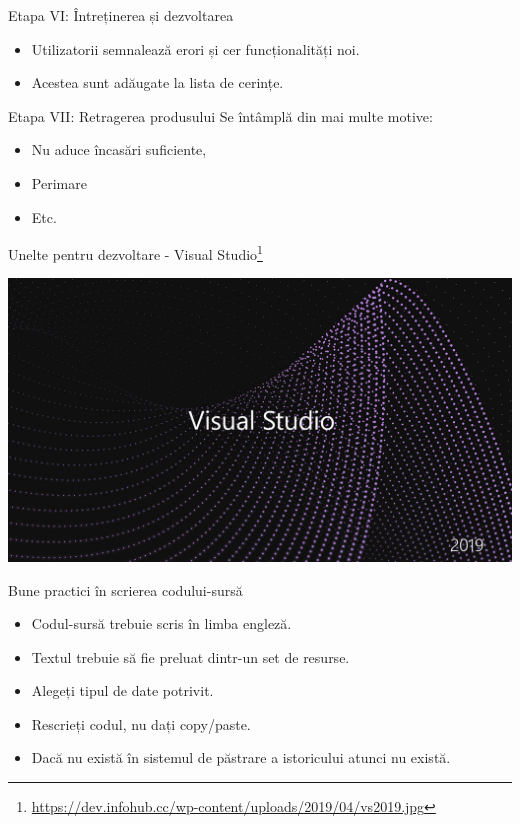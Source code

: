 \documentclass[presentation]{beamer}
\begin{document}
\begin{frame}[label={sec:orgfe1fb78}]{Etapa VI: Întreținerea și dezvoltarea}
\begin{itemize}
\item Utilizatorii semnalează erori și cer funcționalități noi.
\item Acestea sunt adăugate la lista de cerințe.
\end{itemize}
\end{frame}
\begin{frame}[label={sec:orgeefd8d9}]{Etapa VII: Retragerea produsului}
Se întâmplă din mai multe motive:
\begin{itemize}
\item Nu aduce încasări suficiente,
\item Perimare
\item Etc.
\end{itemize}
\end{frame}
\begin{frame}[label={sec:orga5aa407}]{Unelte pentru dezvoltare - Visual Studio\footnote{\url{https://dev.infohub.cc/wp-content/uploads/2019/04/vs2019.jpg}}}
\begin{center}
\includegraphics[width=.9\linewidth]{img/vs2019.jpg}
\end{center}
\end{frame}
\begin{frame}[label={sec:org9e1ee7a}]{Bune practici în scrierea codului-sursă}
\begin{itemize}
\item Codul-sursă trebuie scris în limba engleză.
\item Textul trebuie să fie preluat dintr-un set de resurse.
\item Alegeți tipul de date potrivit.
\item Rescrieți codul, nu dați copy/paste.
\item Dacă nu există în sistemul de păstrare a istoricului atunci nu există.
\end{itemize}
\end{frame}
\end{document}
